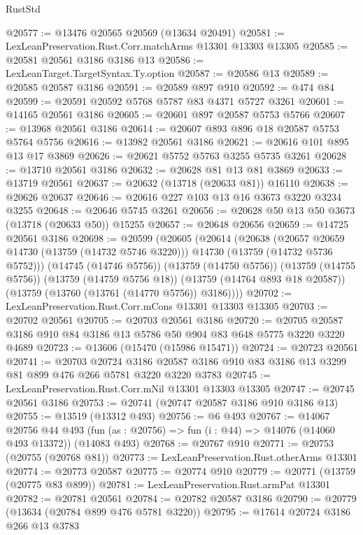 \begin{lexlean}{RustStd}
\begin{coremodule}
@20577 := @13476 @20565 @20569 (@13634 @20491)
@20581 := LexLeanPreservation.Rust.Corr.matchArms @13301 @13303 @13305
@20585 := @20581 @20561 @3186 @3186 @13
@20586 := LexLeanTarget.TargetSyntax.Ty.option
@20587 := @20586 @13
@20589 := @20585 @20587 @3186
@20591 := @20589 @897 @910
@20592 := @474 @84
@20599 := @20591 @20592 @5768 @5787 @83 @4371 @5727 @3261
@20601 := @14165 @20561 @3186
@20605 := @20601 @897 @20587 @5753 @5766
@20607 := @13968 @20561 @3186
@20614 := @20607 @893 @896 @18 @20587 @5753 @5764 @5756
@20616 := @13982 @20561 @3186
@20621 := @20616 @101 @895 @13 @17 @3869
@20626 := @20621 @5752 @5763 @3255 @5735 @3261
@20628 := @13710 @20561 @3186
@20632 := @20628 @81 @13 @81 @3869
@20633 := @13719 @20561
@20637 := @20632 (@13718 (@20633 @81)) @16110
@20638 := @20626 @20637
@20646 := @20616 @227 @103 @13 @16 @3673 @3220 @3234 @3255
@20648 := @20646 @5745 @3261
@20656 := @20628 @50 @13 @50 @3673 (@13718 (@20633 @50)) @15255
@20657 := @20648 @20656
@20659 := @14725 @20561 @3186
@20698 := @20599
    (@20605
      (@20614
        (@20638
          (@20657 @20659 @14730 (@13759 (@14732 @5746 @3220)))
          @14730
          (@13759 (@14732 @5736 @5752)))
        (@14745 (@14746 @5756))
        (@13759 (@14750 @5756))
        (@13759 (@14755 @5756))
        (@13759 (@14759 @5756 @18))
        (@13759 (@14764 @893 @18 @20587))
        (@13759 (@13760 (@13761 (@14770 @5756)) @3186))))
@20702 := LexLeanPreservation.Rust.Corr.mCons @13301 @13303 @13305
@20703 := @20702 @20561
@20705 := @20703 @20561 @3186
@20720 := @20705 @20587 @3186 @910 @84 @3186 @13 @5786 @50 @904 @83 @648 @5775 @3220 @3220 @4689
@20723 := @13606 (@15470 (@15986 @15471))
@20724 := @20723 @20561
@20741 := @20703
    @20724
    @3186
    @20587
    @3186
    @910
    @83
    @3186
    @13
    @3299
    @81
    @899
    @476
    @266
    @5781
    @3220
    @3220
    @3783
@20745 := LexLeanPreservation.Rust.Corr.mNil @13301 @13303 @13305
@20747 := @20745 @20561 @3186
@20753 := @20741 (@20747 @20587 @3186 @910 @3186 @13)
@20755 := @13519 (@13312 @493)
@20756 := @6 @493
@20767 := @14067
    @20756
    @44
    @493
    (fun (as : @20756) => fun (i : @44) => @14076 (@14060 @493 @13372))
    (@14083 @493)
@20768 := @20767 @910
@20771 := @20753 (@20755 (@20768 @81))
@20773 := LexLeanPreservation.Rust.otherArms @13301
@20774 := @20773 @20587
@20775 := @20774 @910
@20779 := @20771 (@13759 (@20775 @83 @899))
@20781 := LexLeanPreservation.Rust.armPat @13301
@20782 := @20781 @20561
@20784 := @20782 @20587 @3186
@20790 := @20779 (@13634 (@20784 @899 @476 @5781 @3220))
@20795 := @17614 @20724 @3186 @266 @13 @3783

\end{coremodule}
\end{lexlean}
